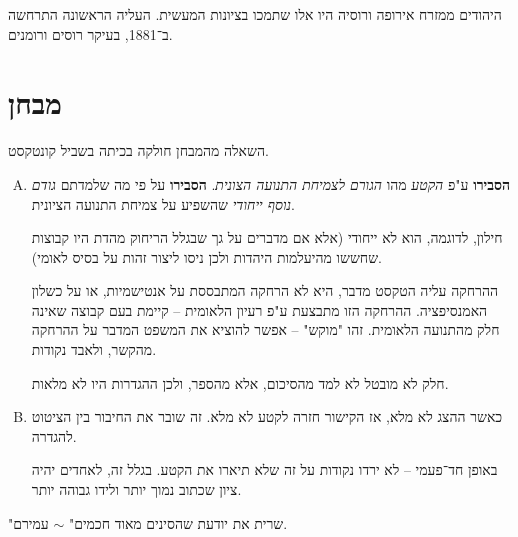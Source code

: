\documentclass[]{article}
\begin{document}
	היהודים ממזרח אירופה ורוסיה היו אלו שתמכו בציונות המעשית. העליה הראשונה התרחשה ב־1881, בעיקר רוסים ורומנים. 
	
	\section{מבחן}
	השאלה מהמבחן חולקה בכיתה בשביל קונטקסט. 
	\begin{enumerate}[A.]
		\item \textbf{הסבירו} ע"פ \textit{הקטע} מהו \textit{הגורם לצמיחת התנועה הצונית}. \textbf{הסבירו} על פי מה שלמדתם \textit{גודם נוסף ייחודי} שהשפיע על צמיחת התנועה הציונית. 
		
		חילון, לדוגמה, הוא לא ייחודי (אלא אם מדברים על גך שבגלל הריחוק מהדת היו קבוצות שחששו מהיעלמות היהדות ולכן ניסו ליצור זהות על בסיס לאומי). 
		
		ההרחקה עליה הטקסט מדבר, היא לא הרחקה המתבססת על אנטישמיות, או על כשלון האמנסיפציה. ההרחקה הזו מתבצעת ע"פ רעיון הלאומית – קיימת בעם קבוצה שאינה חלק מהתנועה הלאומית. זהו "מוקש" – אפשר להוציא את המשפט המדבר על ההרחקה מהקשר, ולאבד נקודות. 
		
		חלק לא מובטל לא למד מהסיכום, אלא מהספר, ולכן ההגדרות היו לא מלאות. 
		
		\item כאשר ההצג לא מלא, אז הקישור חזרה לקטע לא מלא. זה שובר את החיבור בין הציטוט להגדרה. 
		
		באופן חד־פעמי – לא ירדו נקודות על זה שלא תיארו את הקטע. בגלל זה, לאחדים יהיה ציון שכתוב נמוך יותר ולידו גבוהה יותר. 
		
	\end{enumerate}
	
	"שרית את יודעת שהסינים מאוד חכמים" $\sim$ עמירם. 
	
\end{document}
